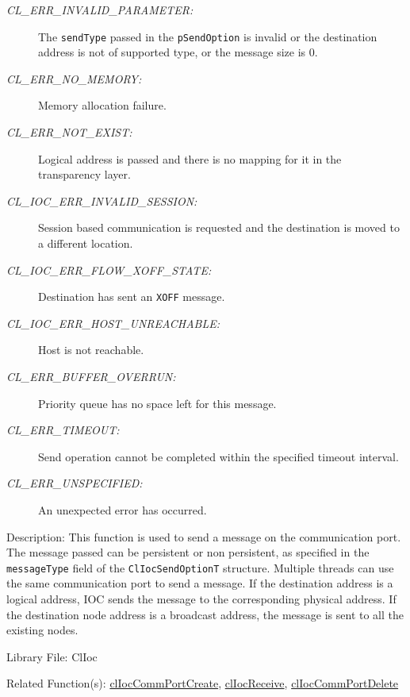 \begin{flushleft}
\begin{Desc}
\begin{description}
\item[{\em CL\_\-ERR\_\-INVALID\_\-PARAMETER:}]The {\tt{send\-Type}} passed in the {\tt{p\-Send\-Option}} is invalid or the destination address is not of
supported type, or the message size is 0. 
\item[{\em CL\_\-ERR\_\-NO\_\-MEMORY:}]Memory allocation failure. 
\item[{\em CL\_\-ERR\_\-NOT\_\-EXIST:}]Logical address is passed and there is no mapping for it in the transparency layer. 
\item[{\em CL\_\-IOC\_\-ERR\_\-INVALID\_\-SESSION:}]Session based communication is requested and the destination is moved to a different location. 
\item[{\em CL\_\-IOC\_\-ERR\_\-FLOW\_\-XOFF\_\-STATE:}]Destination has sent an {\tt{XOFF}} message. 
\item[{\em CL\_\-IOC\_\-ERR\_\-HOST\_\-UNREACHABLE:}]Host is not reachable.
\item[{\em CL\_\-ERR\_\-BUFFER\_\-OVERRUN:}]Priority queue has no space left for this message. 
\item[{\em CL\_\-ERR\_\-TIMEOUT:}]Send operation cannot be completed within the specified timeout interval. 
\item[{\em CL\_\-ERR\_\-UNSPECIFIED:}]An unexpected error has occurred.\end{description}
\end{Desc}
\begin{Desc}
\item[Description:]This function is used to send a message on the communication port. The message passed can be persistent or non persistent, as specified 
in the {\tt{message\-Type}} field of the {\tt{ClIocSendOptionT}} structure. Multiple threads can use the same communication port to send a message. If the
destination address is a logical address, IOC sends the message to the corresponding physical address. If the destination node address is a 
broadcast address, the message is sent to all the existing nodes.\end{Desc}
\begin{Desc}
\item[Library File:]Cl\-Ioc\end{Desc}
\begin{Desc}
\item[Related Function(s):]\hyperlink{pageioc101}{cl\-Ioc\-Comm\-Port\-Create}, \hyperlink{pageioc105}{cl\-Ioc\-Receive},
\hyperlink{pageioc103}{cl\-Ioc\-Comm\-Port\-Delete} \end{Desc}
\newpage




\end{flushleft}
